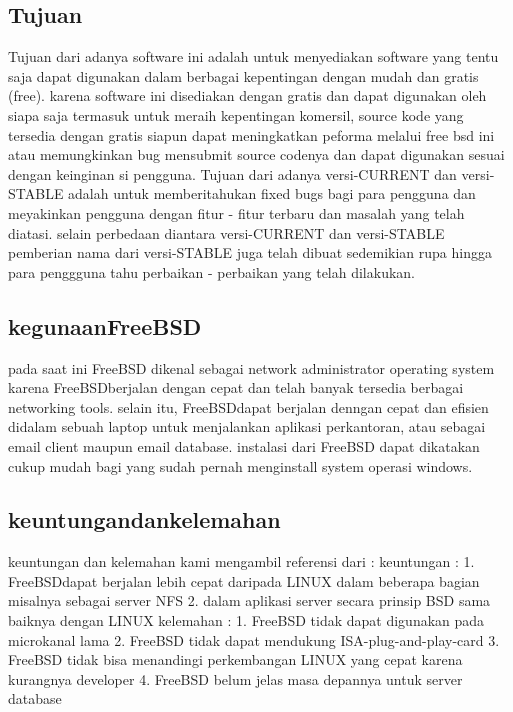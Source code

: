 {\subsection{Tujuan}
	Tujuan dari adanya software ini adalah untuk menyediakan software yang tentu saja dapat digunakan dalam berbagai kepentingan dengan mudah dan gratis (free). karena software ini disediakan dengan gratis dan dapat digunakan oleh siapa saja termasuk untuk meraih kepentingan komersil, 
	source kode yang tersedia dengan gratis siapun dapat meningkatkan  peforma melalui free bsd ini atau memungkinkan bug mensubmit source codenya dan dapat digunakan sesuai dengan keinginan si pengguna.
	Tujuan dari adanya versi-CURRENT dan versi-STABLE adalah untuk memberitahukan fixed bugs bagi para pengguna
	dan meyakinkan pengguna dengan fitur - fitur terbaru dan masalah yang telah diatasi. selain perbedaan diantara versi-CURRENT dan versi-STABLE
	pemberian nama dari versi-STABLE juga telah dibuat sedemikian rupa hingga para penggguna tahu  perbaikan - perbaikan yang telah dilakukan.
\subsection{kegunaanFreeBSD}
	pada saat ini FreeBSD dikenal sebagai network administrator operating system karena FreeBSDberjalan dengan cepat dan telah banyak tersedia berbagai networking tools. selain itu, FreeBSDdapat berjalan denngan cepat dan efisien didalam sebuah laptop untuk menjalankan aplikasi perkantoran, atau sebagai email client maupun email database.
	instalasi dari FreeBSD dapat dikatakan cukup mudah bagi yang sudah pernah menginstall system operasi windows.
\subsection{keuntungandankelemahan}
	keuntungan dan kelemahan kami mengambil referensi dari : \cite{nugroho2015analisis}
	keuntungan :
	1. FreeBSDdapat berjalan lebih cepat daripada LINUX dalam beberapa bagian misalnya sebagai server NFS
	2. dalam aplikasi server secara prinsip BSD sama baiknya dengan LINUX
	kelemahan :
	1. FreeBSD tidak dapat digunakan pada microkanal lama
	2. FreeBSD tidak dapat mendukung ISA-plug-and-play-card
	3. FreeBSD tidak bisa menandingi perkembangan LINUX yang cepat karena kurangnya developer
	4. FreeBSD belum jelas masa depannya untuk server database
}
